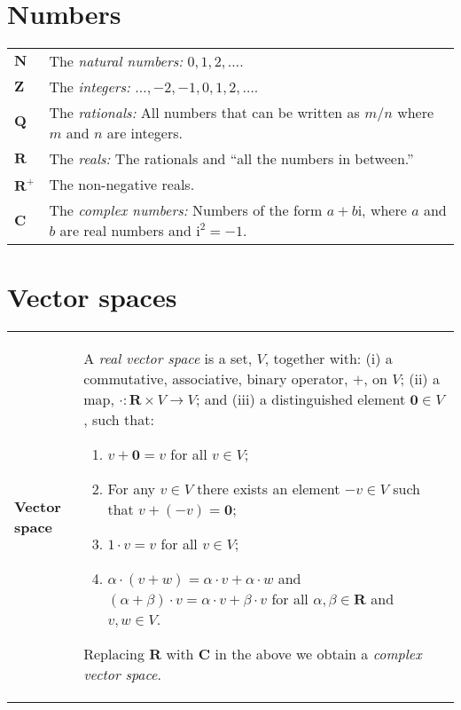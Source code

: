 \documentclass[10pt, a4paper, landscape]{article}
\newcommand{\defn}[1]{\textbf{#1}}
\newcommand{\set}[1]{\mathbold{#1}}
\newcommand{\imag}{\mathrm{i}}
\begin{document}
\begin{multicols*}{3}
\section*{Numbers}
\begin{tabularx}{\columnwidth}{@{}l>{\raggedright\arraybackslash}X@{}}
  \toprule
  $\set{N}$ & The \emph{natural numbers:} $0, 1, 2, \dotsc$. \\
  $\set{Z}$ & The \emph{integers:} $\dotsc, -2, -1, 0, 1, 2, \dotsc$. \\
  $\set{Q}$ & The \emph{rationals:} All numbers that can be written
  as $m/n$ where $m$ and $n$ are integers. \\
  $\set{R}$ & The \emph{reals:} The rationals and ``all the numbers in
  between.'' \\
  $\set{R}^+$ & The non-negative reals. \\
  $\set{C}$ & The \emph{complex numbers:} Numbers of the form $a + b\imag$, where $a$ and $b$ are real numbers and $\imag^2=-1$. 
\end{tabularx}


\section*{Vector spaces}
\begin{tabularx}{\columnwidth}{@{}l>{\raggedright\arraybackslash}X@{}}
  \toprule \defn{Vector space} & A \emph{real vector space} is a set,
  $V$, together with: (i) a commutative, associative, binary operator,
  $+$, on $V$; (ii) a map, $\cdot\colon \set{R}\times V\to V$; and (iii) a
  distinguished element $\mathbold{0}\in V$, such that:
  \begin{enumerate}
  \item $v + \mathbold{0} = v$ for all $v\in V$;
  \item For any $v\in V$ there exists an element $-v \in V$ such that $v+(-v)=\mathbold{0}$;
  \item $1 \cdot v = v$ for all $v\in V$;
  \item $\alpha\cdot(v+w) = \alpha\cdot v+ \alpha\cdot w$ and $(\alpha+\beta)\cdot v = \alpha\cdot v + \beta \cdot v$ for all $\alpha, \beta\in \set{R}$ and $v,w \in V$.
  \end{enumerate}

  Replacing $\set{R}$ with $\set{C}$ in the above we obtain a
  \emph{complex vector space}. \\


\end{tabularx}
\end{multicols*}
\end{document}
